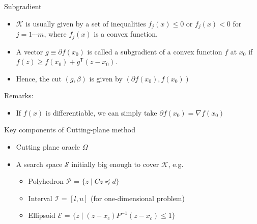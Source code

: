 \documentclass[
  ignorenonframetext,
  aspectratio=169,
  serif,onlymath]{beamer}
\providecommand{\tightlist}{%
  \setlength{\itemsep}{0pt}\setlength{\parskip}{0pt}}
\begin{document}
\begin{frame}{Subgradient}
\protect\hypertarget{subgradient}{}

\begin{itemize}
\item
  \(\mathcal{K}\) is usually given by a set of inequalities
  \(f_j(x) \le 0\) or \(f_j(x) < 0\) for \(j = 1 \cdots m\), where
  \(f_j(x)\) is a convex function.
\item
  A vector \(g \equiv \partial f(x_0)\) is called a subgradient of a
  convex function \(f\) at \(x_0\) if
  \(f(z) \ge f(x_0) + g^\mathsf{T} (z - x_0)\).
\item
  Hence, the cut \((g, \beta)\) is given by
  \((\partial f(x_0), f(x_0))\)
\end{itemize}

Remarks:

\begin{itemize}
\tightlist
\item
  If \(f(x)\) is differentiable, we can simply take
  \(\partial f(x_0) = \nabla f(x_0)\)
\end{itemize}

\end{frame}

\begin{frame}{Key components of Cutting-plane method}
\protect\hypertarget{key-components-of-cutting-plane-method}{}

\begin{itemize}
\tightlist
\item
  Cutting plane oracle \(\Omega\)
\item
  A search space \(\mathcal{S}\) initially big enough to cover
  \(\mathcal{K}\), e.g.

  \begin{itemize}
  \tightlist
  \item
    Polyhedron \(\mathcal{P}\) = \(\{z \mid C z \preceq d \}\)
  \item
    Interval \(\mathcal{I}\) = \([l, u]\) (for one-dimensional problem)
  \item
    Ellipsoid \(\mathcal{E}\) =
    \(\{z \mid (z-x_c)P^{-1}(z-x_c) \le 1 \}\)
  \end{itemize}
\end{itemize}

\end{frame}
\end{document}
